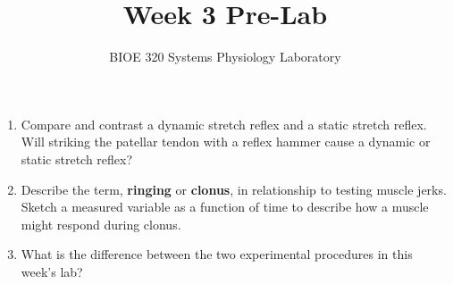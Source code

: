 \documentclass{article}
\title{Week 3 Pre-Lab}
\author{BIOE 320 Systems Physiology Laboratory}
\date{}
\begin{document}
\maketitle
\large

\begin{enumerate}
	\item Compare and contrast a dynamic stretch reflex and a static stretch reflex. Will striking the patellar tendon with a reflex hammer cause a dynamic or static stretch reflex?
	\item Describe the term, \textbf{ringing} or \textbf{clonus}, in relationship to testing muscle jerks. Sketch a measured variable as a function of time to describe how a muscle might respond during clonus.
	\item What is the difference between the two experimental procedures in this week's lab?
\end{enumerate}
\end{document}
